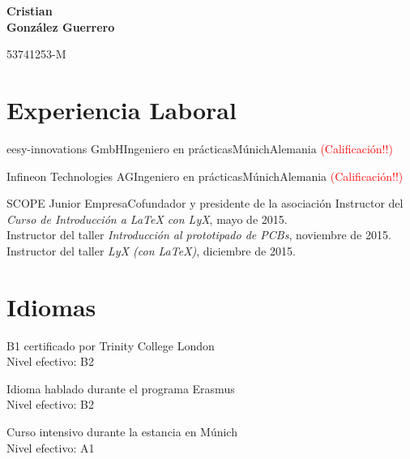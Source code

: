 \documentclass[11pt,a4paper,sans,spanish]{moderncv}
\begin{document}
\begin{minipage}[c]{\textwidth-110pt-0.5em}
    \begin{flushright}
        \textbf{\Huge{Cristian\\\vspace{4pt}González Guerrero}}

        \vspace{4pt}
        \small{53741253-M}
    \end{flushright}
\end{minipage}
\vspace{-5em}

\makecvtitle

\section{Experiencia Laboral}

{eesy-innovations GmbH}{Ingeniero en prácticas}{Múnich}{Alemania}
{\textcolor{red}{(Calificación!!)}}

{Infineon Technologies AG}{Ingeniero en prácticas}{Múnich}{Alemania}
{\textcolor{red}{(Calificación!!)}}

{SCOPE Junior Empresa}{Cofundador y presidente de la asociación}{}{}
{Instructor del \emph{Curso de Introducción a LaTeX con LyX}, mayo de 2015.\\
Instructor del taller \emph{Introducción al prototipado de PCBs}, noviembre de 2015.\\
Instructor del taller \emph{LyX (con LaTeX)}, diciembre de 2015.}


\section{Idiomas}


{B1 certificado por Trinity College London\\Nivel efectivo: B2}

{Idioma hablado durante el programa Erasmus\\Nivel efectivo: B2}

{Curso intensivo durante la estancia en Múnich\\Nivel efectivo: A1} 
\end{document}
